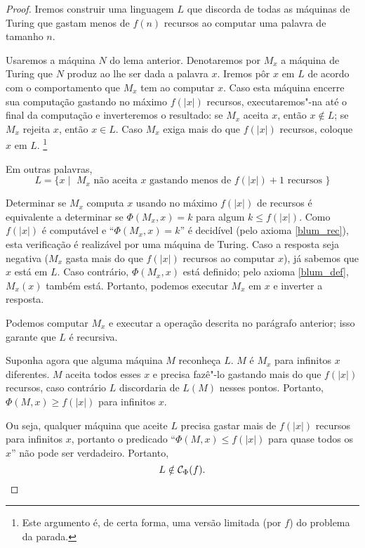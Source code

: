 \begin{proof}
    Iremos construir uma linguagem $L$
    que discorda de todas as máquinas de Turing que gastam menos de
    $f(n)$ recursos ao computar uma palavra de tamanho $n$.

    Usaremos a máquina $N$ do lema anterior.
    Denotaremos por $M_x$
    a máquina de Turing que $N$ produz
    ao lhe ser dada a palavra $x$.
    Iremos pôr $x$ em $L$
    de acordo com o comportamento que $M_x$ tem ao computar $x$.
    Caso esta máquina encerre sua computação
    gastando no máximo $f(|x|)$ recursos,
    executaremos"-na até o final da computação
    e inverteremos o resultado:
    se $M_x$ aceita $x$, então $x \notin L$;
    se $M_x$ rejeita $x$, então $x \in L$.
    Caso $M_x$ exiga mais do que $f(|x|)$ recursos,
    coloque $x$ em $L$.
    \footnote{
        Este argumento é,
        de certa forma,
        uma versão limitada
        (por $f$)
        do problema da parada.
    }

    Em outras palavras,
    \begin{equation*}
        L = \{ x \mid \text{
            $M_x$ não aceita $x$ gastando menos de $f(|x|)+1$ recursos
        } \}
    \end{equation*}

    Determinar se $M_x$ computa $x$ usando no máximo $f(|x|)$ de recursos
    é equivalente a determinar se $\Phi(M_x, x) = k$
    para algum $k \leq f(|x|)$.
    Como $f(|x|)$ é computável
    e ``$\Phi(M_x, x) = k$'' é decidível
    (pelo axioma \ref{blum_rec}),
    esta verificação é realizável por uma máquina de Turing.
    Caso a resposta seja negativa
    ($M_x$ gasta mais do que $f(|x|)$ recursos ao computar $x$),
    já sabemos que $x$ está em $L$.
    Caso contrário,
    $\Phi(M_x, x)$ está definido;
    pelo axioma \ref{blum_def},
    $M_x(x)$ também está.
    Portanto, podemos executar $M_x$ em $x$
    e inverter a resposta.

    Podemos computar $M_x$ e executar a operação descrita no parágrafo anterior;
    isso garante que $L$ é recursiva.

    Suponha agora que alguma máquina $M$ reconheça $L$.
    $M$ é $M_x$ para infinitos $x$ diferentes.
    $M$ aceita todos esses $x$
    e precisa fazê"-lo gastando mais do que $f(|x|)$ recursos,
    caso contrário $L$ discordaria de $L(M)$ nesses pontos.
    Portanto, $\Phi(M, x) \geq f(|x|)$ para infinitos $x$.

    Ou seja, qualquer máquina que aceite $L$
    precisa gastar mais de $f(|x|)$ recursos para infinitos $x$,
    portanto o predicado ``$\Phi(M, x) \leq f(|x|)$ para quase todos os $x$''
    não pode ser verdadeiro.
    Portanto,
    \begin{equation*}
        L \notin \mathcal C_\Phi(f). \qedhere
    \end{equation*}
\end{proof}
